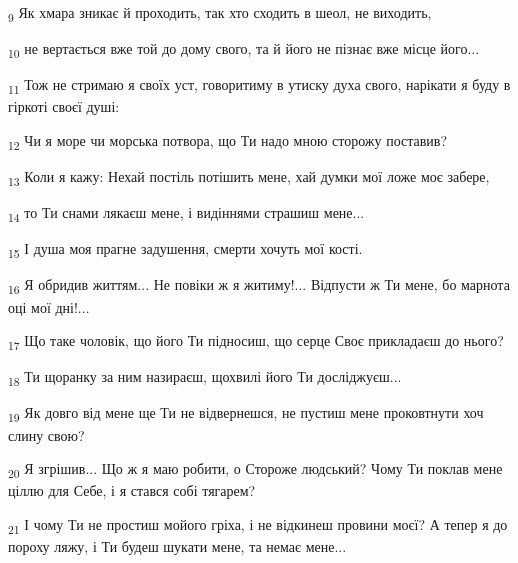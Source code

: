 \begin{tcolorbox}
\textsubscript{9} Як хмара зникає й проходить, так хто сходить в шеол, не виходить,
\end{tcolorbox}
\begin{tcolorbox}
\textsubscript{10} не вертається вже той до дому свого, та й його не пізнає вже місце його...
\end{tcolorbox}
\begin{tcolorbox}
\textsubscript{11} Тож не стримаю я своїх уст, говоритиму в утиску духа свого, нарікати я буду в гіркоті своєї душі:
\end{tcolorbox}
\begin{tcolorbox}
\textsubscript{12} Чи я море чи морська потвора, що Ти надо мною сторожу поставив?
\end{tcolorbox}
\begin{tcolorbox}
\textsubscript{13} Коли я кажу: Нехай постіль потішить мене, хай думки мої ложе моє забере,
\end{tcolorbox}
\begin{tcolorbox}
\textsubscript{14} то Ти снами лякаєш мене, і видіннями страшиш мене...
\end{tcolorbox}
\begin{tcolorbox}
\textsubscript{15} І душа моя прагне задушення, смерти хочуть мої кості.
\end{tcolorbox}
\begin{tcolorbox}
\textsubscript{16} Я обридив життям... Не повіки ж я житиму!... Відпусти ж Ти мене, бо марнота оці мої дні!...
\end{tcolorbox}
\begin{tcolorbox}
\textsubscript{17} Що таке чоловік, що його Ти підносиш, що серце Своє прикладаєш до нього?
\end{tcolorbox}
\begin{tcolorbox}
\textsubscript{18} Ти щоранку за ним назираєш, щохвилі його Ти досліджуєш...
\end{tcolorbox}
\begin{tcolorbox}
\textsubscript{19} Як довго від мене ще Ти не відвернешся, не пустиш мене проковтнути хоч слину свою?
\end{tcolorbox}
\begin{tcolorbox}
\textsubscript{20} Я згрішив... Що ж я маю робити, о Стороже людський? Чому Ти поклав мене ціллю для Себе, і я стався собі тягарем?
\end{tcolorbox}
\begin{tcolorbox}
\textsubscript{21} І чому Ти не простиш мойого гріха, і не відкинеш провини моєї? А тепер я до пороху ляжу, і Ти будеш шукати мене, та немає мене...
\end{tcolorbox}
